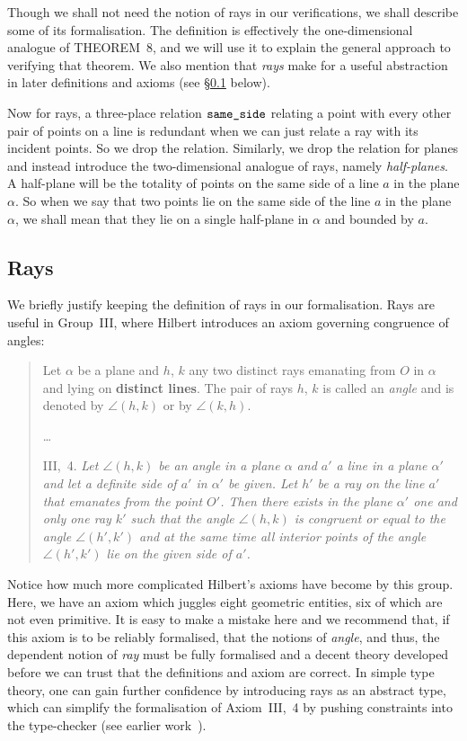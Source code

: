 Though we shall not need the notion of rays in our verifications, we shall describe some of its formalisation. The definition is effectively the one-dimensional analogue of THEOREM~8, and we will use it to explain the general approach to verifying that theorem. We also mention that \emph{rays} make for a useful abstraction in later definitions and axioms (see \S\ref{sec:RaysDef} below).

Now for rays, a three-place relation $\texttt{same\_side}$ relating a point with every other pair of points on a line is redundant when we can just relate a ray with its incident points. So we drop the relation. Similarly, we drop the relation for planes and instead introduce the two-dimensional analogue of rays, namely \emph{half-planes}. A half-plane will be the totality of points on the same side of a line $a$ in the plane $\alpha$. So when we say that two points lie on the same side of the line $a$ in the plane $\alpha$, we shall mean that they lie on a single half-plane in $\alpha$ and bounded by $a$. 

\subsection{Rays}\label{sec:RaysDef}
We briefly justify keeping the definition of rays in our formalisation. Rays are useful in Group~III, where Hilbert introduces an axiom governing congruence of angles:

\begin{quotation}
  Let $\alpha$ be a plane and $h$, $k$ any two distinct rays emanating from $O$ in $\alpha$ and lying on {\bfseries distinct lines}. The pair of rays $h$, $k$ is called an \emph{angle} and is denoted by $\angle(h,k)$ or by $\angle(k,h)$.

\ldots

III,~4. \emph{Let $\angle (h,k)$ be an angle in a plane $\alpha$ and $a'$ a line in a plane $\alpha'$ and let a definite side of $a'$ in $\alpha'$ be given. Let $h'$ be a ray on the line $a'$ that emanates from the point $O'$. Then there exists in the plane $\alpha'$ one and only one ray $k'$ such that the angle $\angle (h,k)$ is congruent or equal to the angle $\angle (h',k')$ and at the same time all interior points of the angle $\angle (h',k')$ lie on the given side of $a'$.}
\end{quotation}

Notice how much more complicated Hilbert's axioms have become by this group. Here, we have an axiom which juggles eight geometric entities, six of which are not even primitive. It is easy to make a mistake here and we recommend that, if this axiom is to be reliably formalised, that the notions of \emph{angle}, and thus, the dependent notion of \emph{ray} must be fully formalised and a decent theory developed before we can trust that the definitions and axiom are correct. In simple type theory, one can gain further confidence by introducing rays as an abstract type, which can simplify the formalisation of Axiom~III,~4 by pushing constraints into the type-checker (see earlier work~\cite{ScottMScThesis}). 

